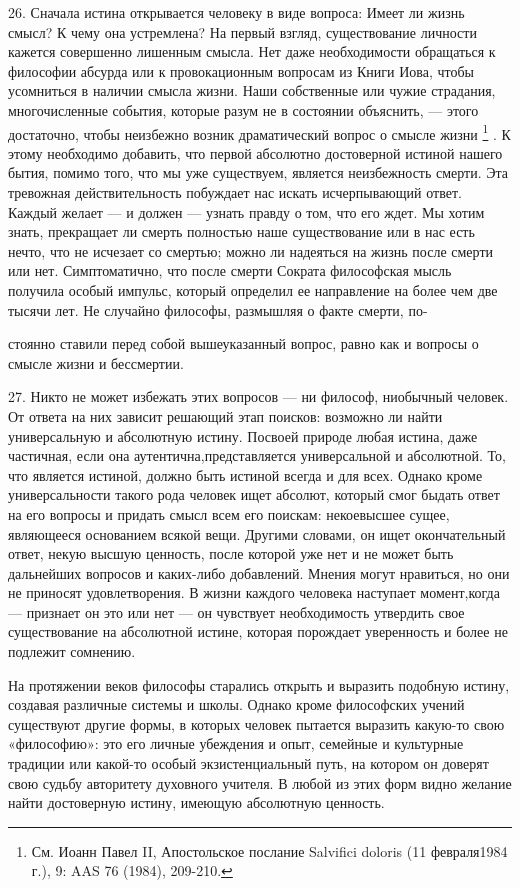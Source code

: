 \documentclass[a5paper,10pt]{article}
\begin{document}
26. Сначала истина открывается человеку в виде вопроса: Имеет ли жизнь смысл? К
чему она устремлена? На первый взгляд, существование личности кажется
совершенно лишенным смысла. Нет даже необходимости обращаться к философии
абсурда или к провокационным вопросам из Книги Иова, чтобы усомниться в наличии
смысла жизни. Наши собственные или чужие страдания, многочисленные события,
которые разум не в состоянии объяснить, — этого достаточно, чтобы неизбежно
возник драматический вопрос о смысле жизни \footnote{См. Иоанн Павел II,
Апостольское послание Salvifici doloris (11 февраля1984 г.), 9: AAS 76 (1984),
209-210.}  . К этому необходимо добавить, что первой абсолютно достоверной
истиной нашего бытия, помимо того, что мы уже существуем, является неизбежность
смерти. Эта тревожная действительность побуждает нас искать исчерпывающий
ответ. Каждый желает — и должен — узнать правду о том, что его ждет. Мы хотим
знать, прекращает ли смерть полностью наше существование или в нас есть нечто,
что не исчезает со смертью; можно ли надеяться на жизнь после смерти или нет.
Симптоматично, что после смерти Сократа философская мысль получила особый
импульс, который определил ее направление на более чем две тысячи лет. Не
случайно философы, размышляя о факте смерти, по-

стоянно ставили перед собой вышеуказанный вопрос, равно как и вопросы о смысле
жизни и бессмертии.

27. Никто не может избежать этих вопросов — ни философ, ниобычный человек. От
ответа на них зависит решающий этап поисков: возможно ли найти универсальную и
абсолютную истину. Посвоей природе любая истина, даже частичная, если она
аутентична,представляется универсальной и абсолютной. То, что является истиной,
должно быть истиной всегда и для всех. Однако кроме универсальности такого рода
человек ищет абсолют, который смог быдать ответ на его вопросы и придать смысл
всем его поискам: некоевысшее сущее, являющееся основанием всякой вещи. Другими
словами, он ищет окончательный ответ, некую высшую ценность, после которой уже
нет и не может быть дальнейших вопросов и каких-либо добавлений. Мнения могут
нравиться, но они не приносят удовлетворения. В жизни каждого человека
наступает момент,когда — признает он это или нет — он чувствует необходимость
утвердить свое существование на абсолютной истине, которая порождает
уверенность и более не подлежит сомнению.

На протяжении веков философы старались открыть и выразить подобную истину,
создавая различные системы и школы. Однако кроме философских учений существуют
другие формы, в которых человек пытается выразить какую-то свою «философию»:
это его личные убеждения и опыт, семейные и культурные традиции или какой-то
особый экзистенциальный путь, на котором он доверят свою судьбу авторитету
духовного учителя. В любой из этих форм видно желание найти достоверную истину,
имеющую абсолютную ценность.
\end{document}
